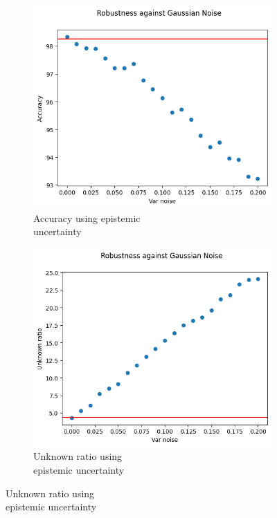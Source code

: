 \begin{figure}[h]
	\centering
	\begin{subfigure}{.33\textwidth}
		\centering
		\includegraphics[width=0.9\linewidth]{ImageFiles/EvalBNN/GN/EU/acc}
		\caption{Accuracy using epistemic \\ uncertainty}
		\label{fig:gn_eu_acc}
	\end{subfigure}%
	\begin{subfigure}{.33\textwidth}
		\centering
		\includegraphics[width=0.9\linewidth]{ImageFiles/EvalBNN/GN/EU/unkn}
		\caption{Unknown ratio using \\ epistemic uncertainty}
		\label{fig:gn_eu_unkn}
	\end{subfigure}%

\end{figure}
